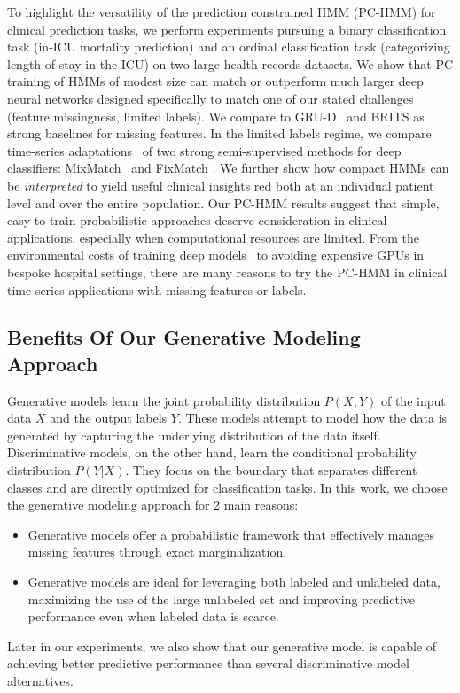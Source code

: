 To highlight the versatility of the prediction constrained HMM (PC-HMM) for clinical prediction tasks, we perform experiments pursuing a binary classification task (in-ICU mortality prediction) and an ordinal classification task (categorizing length of stay in the ICU) on two large health records datasets.
We show that PC training of HMMs of modest size can match or outperform much larger deep neural networks designed specifically to match one of our stated challenges (feature missingness, limited labels).
We compare to 
GRU-D~\citep{cheRecurrentNeuralNetworks2018} and BRITS \citep{caoBRITSBidirectionalRecurrent2018} as strong baselines for missing features.
In the limited labels regime, we compare time-series adaptations~\citep{goschenhofer2021deep} of two strong semi-supervised methods for deep classifiers: MixMatch~\citep{berthelotMixMatchHolisticApproach2019} and FixMatch \citep{sohnFixMatchSimplifyingSemisupervised2020}.
We further show how compact HMMs can be \emph{interpreted} to yield useful clinical insights red both at an individual patient level and over the entire population.
Our PC-HMM results suggest that simple, easy-to-train probabilistic approaches deserve consideration in clinical applications, especially when computational resources are limited.
From the environmental costs of training deep models~\citep{strubellEnergyPolicyConsiderations2019} to avoiding expensive GPUs in bespoke hospital settings,
there are many reasons to try the PC-HMM in clinical time-series applications with missing features or labels. 

\subsection{Benefits Of Our Generative Modeling Approach}
Generative models learn the joint probability distribution $P(X,Y)$ of the input data $X$ and the output labels $Y$. These models attempt to model how the data is generated by capturing the underlying distribution of the data itself. Discriminative models, on the other hand, learn the conditional probability distribution $P(Y|X)$. They focus on the boundary that separates different classes and are directly optimized for classification tasks.
In this work, we choose the generative modeling approach for 2 main reasons:
\begin{itemize}
    \item Generative models offer a probabilistic framework that effectively manages missing features through exact marginalization.

    \item Generative models are ideal for leveraging both labeled and unlabeled data, maximizing the use of the large unlabeled set and improving predictive performance even when labeled data is scarce.
\end{itemize}
Later in our experiments, we also show that our generative model is capable of achieving better predictive performance than several discriminative model alternatives. 

